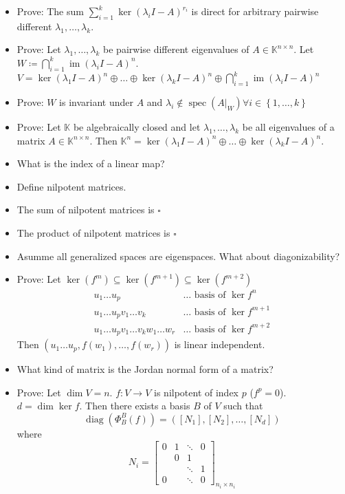 \documentclass[a4paper]{article}
\newcommand{\set}[1]{\left\{#1\right\}}
\DeclareMathOperator{\im}{im}
\begin{document}
\begin{itemize}
  \item Prove: The sum $\sum_{i=1}^k \ker(\lambda_i I - A)^{r_i}$ is direct for arbitrary pairwise different $\lambda_1, \dots, \lambda_k$.
  \item Prove: Let $\lambda_1, \dots, \lambda_k$ be pairwise different eigenvalues of $A \in \mathbb K^{n\times n}$. Let $W \coloneqq \bigcap_{i=1}^k \im(\lambda_i I - A)^n$. $V = \ker(\lambda_1 I - A)^{n} \oplus \dots \oplus \ker(\lambda_k I - A)^n \oplus \bigcap_{i=1}^k \im(\lambda_i I - A)^n$
  \item Prove: $W$ is invariant under $A$ and $\lambda_i \not\in \operatorname{spec}(A|_W) \forall i \in \set{1, \dots, k}$
  \item Prove: Let $\mathbb K$ be algebraically closed and let $\lambda_1, \dots, \lambda_k$ be all eigenvalues of a matrix $A \in \mathbb K^{n\times n}$. Then $\mathbb K^{n} = \ker(\lambda_1 I - A)^n \oplus \dots \oplus \ker(\lambda_k I - A)^n$.
  \item What is the index of a linear map?
  \item Define nilpotent matrices.
  \item The sum of nilpotent matrices is $\square{}$
  \item The product of nilpotent matrices is $\square{}$
  \item Asumme all generalized spaces are eigenspaces. What about diagonizability?
  \item Prove: Let $\ker(f^m) \subseteq \ker(f^{m+1}) \subseteq \ker(f^{m+2})$
    \begin{align*}
      u_1 \dots u_p & \dots \text{ basis of } \ker{f^n} \\
      u_1 \dots u_p v_1 \dots v_k & \dots \text{ basis of } \ker{f^{m+1}} \\
      u_1 \dots u_p v_1 \dots v_k w_1 \dots w_r & \dots \text{ basis of } \ker{f^{m+2}}
    \end{align*}
    Then $(u_1 \dots u_p, f(w_1), \dots, f(w_r))$ is linear independent.
  \item What kind of matrix is the Jordan normal form of a matrix?
  \item Prove: Let $\dim{V} = n$. $f: V \to V$ is nilpotent of index $p$ ($f^p = 0$). $d = \dim\ker{f}$. Then there exists a basis $B$ of $V$ such that
    \[ \operatorname{diag}\left(\Phi_B^B(f)\right) = ([N_1], [N_2], \dots, [N_d]) \]
    where
    \[
      N_i = \begin{bmatrix} 0 & 1 & \ddots & 0 \\  & 0 & 1 & \\ & & \ddots & 1 \\ 0 & & \ddots & 0 \end{bmatrix}_{n_i \times n_i}
\]
\end{itemize}
\end{document}
